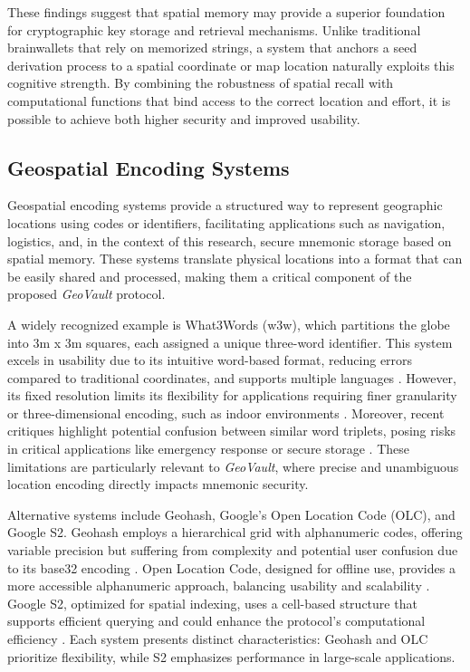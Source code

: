 \documentclass[journal,article,submit,pdftex,moreauthors]{Definitions/mdpi}
\newcommand{\add}[1]{#1}
\newcommand{\add}[1]{\added{#1}}
\begin{document}
\add{These findings suggest that spatial memory may provide a superior foundation for cryptographic key storage and retrieval mechanisms. Unlike traditional brainwallets that rely on memorized strings, a system that anchors a seed derivation process to a spatial coordinate or map location naturally exploits this cognitive strength. By combining the robustness of spatial recall with computational functions that bind access to the correct location and effort, it is possible to achieve both higher security and improved usability.}

\subsection{Geospatial Encoding Systems}

Geospatial encoding systems provide a structured way to represent geographic locations using codes or identifiers, facilitating applications such as navigation, logistics, and, in the context of this research, secure mnemonic storage based on spatial memory. These systems translate physical locations into a format that can be easily shared and processed, making them a critical component of the proposed \textit{GeoVault} protocol.

A widely recognized example is What3Words (w3w), which partitions the globe into 3m x 3m squares, each assigned a unique three-word identifier. This system excels in usability due to its intuitive word-based format, reducing errors compared to traditional coordinates, and supports multiple languages \cite{Jiang2018a}. However, its fixed resolution limits its flexibility for applications requiring finer granularity or three-dimensional encoding, such as indoor environments \cite{Lee2009}. Moreover, recent critiques highlight potential confusion between similar word triplets, posing risks in critical applications like emergency response or secure storage \cite{Arthur2023}. These limitations are particularly relevant to \textit{GeoVault}, where precise and unambiguous location encoding directly impacts mnemonic security.

Alternative systems include Geohash, Google's Open Location Code (OLC), and Google S2. Geohash employs a hierarchical grid with alphanumeric codes, offering variable precision but suffering from complexity and potential user confusion due to its base32 encoding \cite{Mai2022}. Open Location Code, designed for offline use, provides a more accessible alphanumeric approach, balancing usability and scalability \cite{Mai2022}. Google S2, optimized for spatial indexing, uses a cell-based structure that supports efficient querying and could enhance the protocol's computational efficiency \cite{Mai2022}. Each system presents distinct characteristics: Geohash and OLC prioritize flexibility, while S2 emphasizes performance in large-scale applications.
\end{document}
